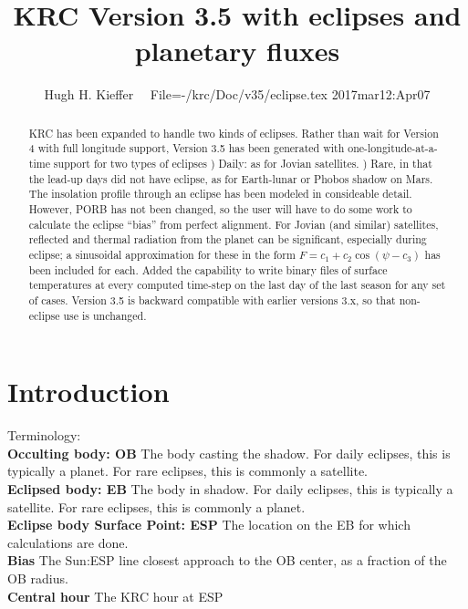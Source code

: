 \documentclass{article}
\title{KRC Version 3.5 with eclipses and planetary fluxes}
\author{Hugh H. Kieffer  \ \ File=-/krc/Doc/v35/eclipse.tex  2017mar12:Apr07}
\begin{document}
\maketitle
\tableofcontents

\begin{abstract}

KRC has been expanded to handle two kinds of eclipses. Rather than wait for
Version 4 with full longitude support, Version 3.5 has been generated with
one-longitude-at-a-time support for two types of eclipses
) Daily: as for Jovian satellites.
) Rare, in that the lead-up days did not have eclipse, as for Earth-lunar or Phobos shadow on Mars. \\
The insolation profile through an eclipse has been modeled in consideable
detail. However, PORB has not been changed, so the user will have to do some
work to calculate the eclipse ``bias'' from perfect alignment. 
For Jovian (and similar) satellites, reflected and thermal radiation from the
planet can be significant, especially during eclipse; a sinusoidal approximation
for these in the form $F=c_1 + c_2 \cos (\psi -c_3)$ has been included for each. 
Added the  capability to write binary files of surface temperatures at every computed time-step on the last day of the last season for any set of cases.  
Version 3.5 is backward compatible with earlier versions 3.x, so that
non-eclipse use is unchanged.

\end{abstract}



\section{Introduction}


Terminology: 
\\ \textbf{Occulting body: OB} The body casting the shadow. For daily eclipses, this is typically a planet. For rare eclipses, this is commonly a satellite. 
\\ \textbf{Eclipsed body: EB} The body in shadow.  For daily eclipses, this is typically a satellite.  For rare eclipses, this is commonly a planet.
\\ \textbf{Eclipse body Surface Point: ESP} The location on the EB for which calculations are done. 
\\ \textbf{Bias} The Sun:ESP line closest approach to the OB center, as a fraction of the OB radius.
\\ \textbf{Central hour} The KRC hour at ESP
\end{document}
